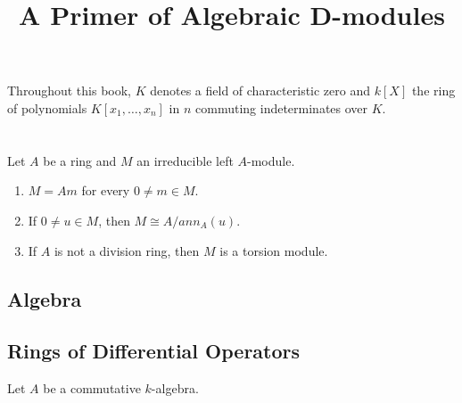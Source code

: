 \documentclass[12pt, oneside]{book}
\begin{document}
\frontmatter
\title{{\Huge{\textbf{A Primer of Algebraic D-modules}}}}
\maketitle
{}
\tableofcontents %


\mainmatter
{} %


Throughout this book, $K$ denotes a field of characteristic zero and $k[X]$ the ring of polynomials $K\left[x_1, \ldots, x_n\right]$ in $n$ commuting indeterminates over $K$.




\chapter{}
\section{}


\begin{proposition}
    Let $A$ be a ring and $M$ an irreducible left $A$-module.
    \begin{enumerate}
        \item
              $M=Am$ for every $0 \neq m \in M$.
        \item
              If $0 \neq u \in M$, then $M \cong A / a n n_A(u)$.
        \item
              If $A$ is not a division ring, then $M$ is a torsion module.
    \end{enumerate}
\end{proposition}


\section{Algebra}


\section{Rings of Differential Operators}
Let $A$ be a commutative $k$-algebra.
\end{document}
